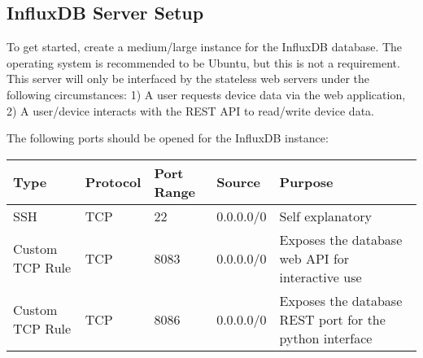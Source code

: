 \documentclass[letterpaper,10pt,english]{sphinxmanual}
\begin{document}
\subsection{InfluxDB Server Setup}
\label{installation:influxdb-server-setup}
To get started, create a medium/large instance for the InfluxDB database. The operating system is recommended to be Ubuntu, but this is not a requirement. This server will only be interfaced by the stateless web servers under the following circumstances: 1) A user requests device data via the web application, 2) A user/device interacts with the REST API to read/write device data.

The following ports should be opened for the InfluxDB instance:

\begin{tabulary}{\linewidth}{|L|L|L|L|L|}
\hline
\textsf{\relax 
Type
} & \textsf{\relax 
Protocol
} & \textsf{\relax 
Port Range
} & \textsf{\relax 
Source
} & \textsf{\relax 
Purpose
}\\
\hline
SSH
 & 
TCP
 & 
22
 & 
0.0.0.0/0
 & 
Self explanatory
\\
\hline
Custom TCP Rule
 & 
TCP
 & 
8083
 & 
0.0.0.0/0
 & 
Exposes the database web API for interactive use
\\
\hline
Custom TCP Rule
 & 
TCP
 & 
8086
 & 
0.0.0.0/0
 & 
Exposes the database REST port for the python interface
\\
\hline\end{tabulary}
\end{document}
